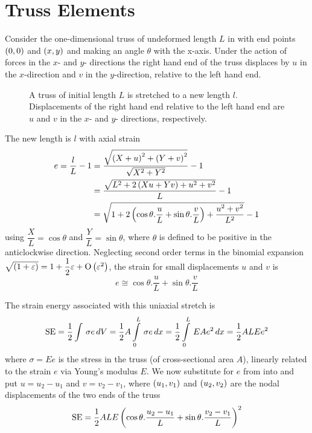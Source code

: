 \section{Truss Elements}

Consider the one-dimensional truss of undeformed length $L$ in
 with end points $\left( 0,0 \right)$ and $\left( x,y \right)$ and making 
an angle $\theta$ with the x-axis. Under the action of forces in the $x$- and
$y$- directions the right hand end of the truss displaces by $u$ in the 
$x$-direction and $v$ in the $y$-direction, relative to the left hand end.

\begin{figure}[htbp] \centering
  
  \caption{A truss of initial length $L$ is stretched to a new length $l$.   
    Displacements of the right hand end relative to the left hand end are $u$ 
    and $v$ in the $x$- and $y$- directions, respectively.}
  \label{fig:truss}
\end{figure}
                      
The new length is $l$ with axial strain
\begin{align*}
  e=\dfrac{l}{L}-1 &= \dfrac{\sqrt{\left( X+u \right)^{2} +
      \left( Y+v \right)^{2}}}{\sqrt{X^{2} + Y^{2}}} -1 \\ 
&=\dfrac{\sqrt{L^{2}+2\left( Xu+Yv \right)+u^{2}+v^{2}}}{L} - 1 \\ 
&= \sqrt{1+2 \left( \cos \theta . \dfrac{u}{L} + \sin \theta . \dfrac{v}{L} \right) +
    \dfrac{u^{2}+v^{2}}{L^{2}}} - 1
\end{align*}
using $\dfrac{X}{L}=\cos \theta$ and $\dfrac{Y}{L}=\sin \theta$, where
$\theta$ is defined to be positive in the anticlockwise direction. Neglecting
second order terms in the binomial expansion $\sqrt{\left( 1+\varepsilon \right)} = 1 +
\dfrac{1}{2}\varepsilon +  \mathrm{O}\left( \varepsilon^{2} \right) $, the strain for small
displacements $u$ and $v$ is
\begin{equation}
  e \cong \cos \theta .\dfrac{u}{L} + \sin \theta .\dfrac{v}{L}
  \label{eqn:strain}
\end{equation}

The strain energy associated with this uniaxial stretch is 
\begin{equation}
  \text{SE} = \dfrac{1}{2}   \displaystyle\int\limits_{}^{} \,\sigma e\,dV  = \dfrac{1}{2} A   \displaystyle\int\limits_{0}^{L} \,\sigma e\,dx  = \dfrac{1}{2}   \displaystyle\int\limits_{0}^{L} \,EAe^{2}\,dx  = \dfrac{1}{2}  ALEe^{2}
  \label{eqn:sen}
\end{equation}
where $\sigma=Ee$ is the stress in the truss (of cross-sectional area $A$),
linearly related to the strain $e$ via Young's modulus $E$. We now substitute
for $e$ from  into  and put $u=u_{2}-u_{1}$
and $v=v_{2}-v_{1}$, where $\left( u_{1},v_{1} \right)$ and $\left( u_{2},v_{2} \right)$ are
the nodal displacements of the two ends of the truss
\begin{equation}
  \text{SE}= \dfrac{1}{2} ALE \left( \cos \theta . \dfrac{u_{2}-u_{1}}{L} + 
    \sin \theta . \dfrac{v_{2}-v_{1}}{L} \right)^{2}
  \label{eqn:tet}
\end{equation}

